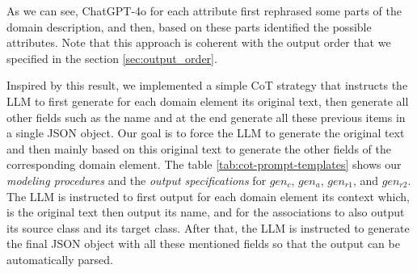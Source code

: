 As we can see, ChatGPT-4o for each attribute first rephrased some parts of the domain description, and then, based on these parts identified the possible attributes. Note that this approach is coherent with the output order that we specified in the section \ref{sec:output_order}.

Inspired by this result, we implemented a simple CoT strategy that instructs the LLM to first generate for each domain element its original text, then generate all other fields such as the name and at the end generate all these previous items in a single JSON object. Our goal is to force the LLM to generate the original text and then mainly based on this original text to generate the other fields of the corresponding domain element.
The table \ref{tab:cot-prompt-templates} shows our \emph{modeling procedures} and the \emph{output specifications} for $gen_c$, $gen_a$, $gen_{r1}$, and $gen_{r2}$.
The LLM is instructed to first output for each domain element its context which, is the original text then output its name, and for the associations to also output its source class and its target class. After that, the LLM is instructed to generate the final JSON object with all these mentioned fields so that the output can be automatically parsed.


